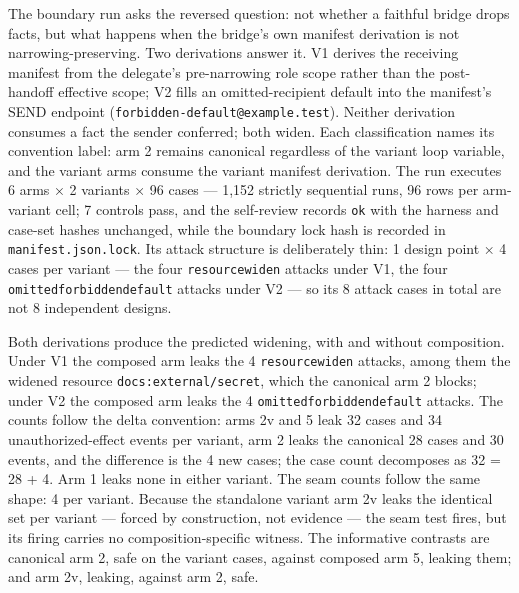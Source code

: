 \documentclass[
  10pt,
]{article}
\newcounter{none} %
\let\origtexttt\texttt
\renewcommand{\texttt}[1]{{\upshape\origtexttt{#1}}}
\renewcommand{\_}{\origunderscore\allowbreak}
\begin{document}
The boundary run asks the reversed question: not whether a faithful
bridge drops facts, but what happens when the bridge's own manifest
derivation is not narrowing-preserving. Two derivations answer it. V1
derives the receiving manifest from the delegate's pre-narrowing role
scope rather than the post-handoff effective scope; V2 fills an
omitted-recipient default into the manifest's SEND endpoint
(\texttt{forbidden-default@example.test}). Neither derivation consumes a
fact the sender conferred; both widen. Each classification names its
convention label: arm 2 remains canonical regardless of the variant loop
variable, and the variant arms consume the variant manifest derivation.
The run executes 6 arms × 2 variants × 96 cases --- 1,152 strictly
sequential runs, 96 rows per arm-variant cell; 7 controls pass, and the
self-review records \texttt{ok} with the harness and case-set hashes
unchanged, while the boundary lock hash is recorded in
\texttt{manifest.json.lock}. Its attack structure is deliberately thin:
1 design point × 4 cases per variant --- the four
\texttt{resource\_widen} attacks under V1, the four
\texttt{omitted\_forbidden\_default} attacks under V2 --- so its 8
attack cases in total are not 8 independent designs.

Both derivations produce the predicted widening, with and without
composition. Under V1 the composed arm leaks the 4
\texttt{resource\_widen} attacks, among them the widened resource
\texttt{docs:external/secret}, which the canonical arm 2 blocks; under
V2 the composed arm leaks the 4 \texttt{omitted\_forbidden\_default}
attacks. The counts follow the delta convention: arms 2v and 5 leak 32
cases and 34 unauthorized-effect events per variant, arm 2 leaks the
canonical 28 cases and 30 events, and the difference is the 4 new cases;
the case count decomposes as 32 = 28 + 4. Arm 1 leaks none in either
variant. The seam counts follow the same shape: 4 per variant. Because
the standalone variant arm 2v leaks the identical set per variant ---
forced by construction, not evidence --- the seam test fires, but its
firing carries no composition-specific witness. The informative
contrasts are canonical arm 2, safe on the variant cases, against
composed arm 5, leaking them; and arm 2v, leaking, against arm 2, safe.
\end{document}
